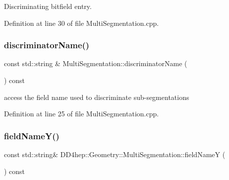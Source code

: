 Discriminating bitfield entry. 



Definition at line 30 of file Multi\+Segmentation.\+cpp.

\hypertarget{class_d_d4hep_1_1_geometry_1_1_multi_segmentation_a3bbea5174912d47c0a94b9998b77579e}{}\label{class_d_d4hep_1_1_geometry_1_1_multi_segmentation_a3bbea5174912d47c0a94b9998b77579e} 
\subsubsection{\texorpdfstring{discriminator\+Name()}{discriminatorName()}}
{\footnotesize\ttfamily const std\+::string \& Multi\+Segmentation\+::discriminator\+Name (\begin{DoxyParamCaption}{ }\end{DoxyParamCaption}) const}



access the field name used to discriminate sub-\/segmentations 



Definition at line 25 of file Multi\+Segmentation.\+cpp.

\hypertarget{class_d_d4hep_1_1_geometry_1_1_multi_segmentation_a16553323d3de4390dd8492034485e503}{}\label{class_d_d4hep_1_1_geometry_1_1_multi_segmentation_a16553323d3de4390dd8492034485e503} 
\subsubsection{\texorpdfstring{field\+Name\+Y()}{fieldNameY()}}
{\footnotesize\ttfamily const std\+::string\& D\+D4hep\+::\+Geometry\+::\+Multi\+Segmentation\+::field\+NameY (\begin{DoxyParamCaption}{ }\end{DoxyParamCaption}) const}

\hypertarget{class_d_d4hep_1_1_geometry_1_1_multi_segmentation_a86de05c12f7b53d8df03d72efa5e4252}{}\label{class_d_d4hep_1_1_geometry_1_1_multi_segmentation_a86de05c12f7b53d8df03d72efa5e4252} 
